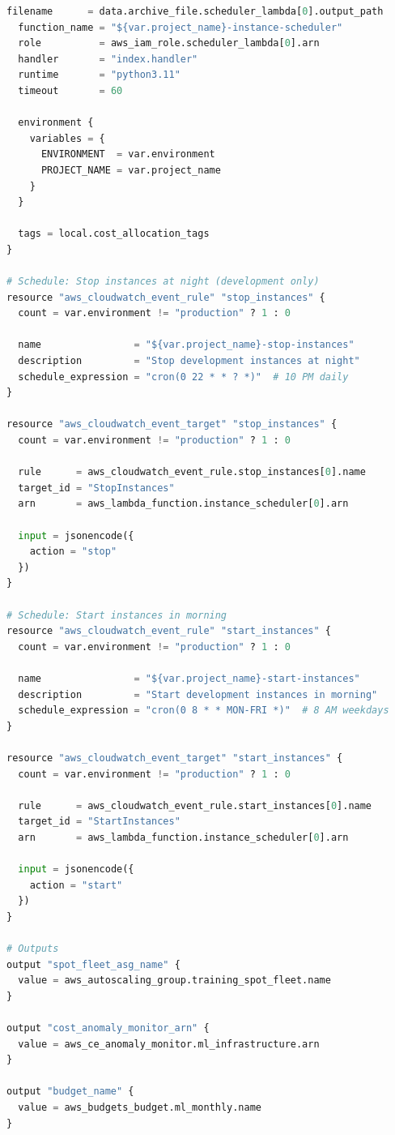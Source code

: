 \begin{lstlisting}[language=Python, caption=Terraform Module for Cost-Optimized ML Infrastructure]
  filename      = data.archive_file.scheduler_lambda[0].output_path
  function_name = "${var.project_name}-instance-scheduler"
  role          = aws_iam_role.scheduler_lambda[0].arn
  handler       = "index.handler"
  runtime       = "python3.11"
  timeout       = 60

  environment {
    variables = {
      ENVIRONMENT  = var.environment
      PROJECT_NAME = var.project_name
    }
  }

  tags = local.cost_allocation_tags
}

# Schedule: Stop instances at night (development only)
resource "aws_cloudwatch_event_rule" "stop_instances" {
  count = var.environment != "production" ? 1 : 0

  name                = "${var.project_name}-stop-instances"
  description         = "Stop development instances at night"
  schedule_expression = "cron(0 22 * * ? *)"  # 10 PM daily
}

resource "aws_cloudwatch_event_target" "stop_instances" {
  count = var.environment != "production" ? 1 : 0

  rule      = aws_cloudwatch_event_rule.stop_instances[0].name
  target_id = "StopInstances"
  arn       = aws_lambda_function.instance_scheduler[0].arn

  input = jsonencode({
    action = "stop"
  })
}

# Schedule: Start instances in morning
resource "aws_cloudwatch_event_rule" "start_instances" {
  count = var.environment != "production" ? 1 : 0

  name                = "${var.project_name}-start-instances"
  description         = "Start development instances in morning"
  schedule_expression = "cron(0 8 * * MON-FRI *)"  # 8 AM weekdays
}

resource "aws_cloudwatch_event_target" "start_instances" {
  count = var.environment != "production" ? 1 : 0

  rule      = aws_cloudwatch_event_rule.start_instances[0].name
  target_id = "StartInstances"
  arn       = aws_lambda_function.instance_scheduler[0].arn

  input = jsonencode({
    action = "start"
  })
}

# Outputs
output "spot_fleet_asg_name" {
  value = aws_autoscaling_group.training_spot_fleet.name
}

output "cost_anomaly_monitor_arn" {
  value = aws_ce_anomaly_monitor.ml_infrastructure.arn
}

output "budget_name" {
  value = aws_budgets_budget.ml_monthly.name
}
\end{lstlisting}

